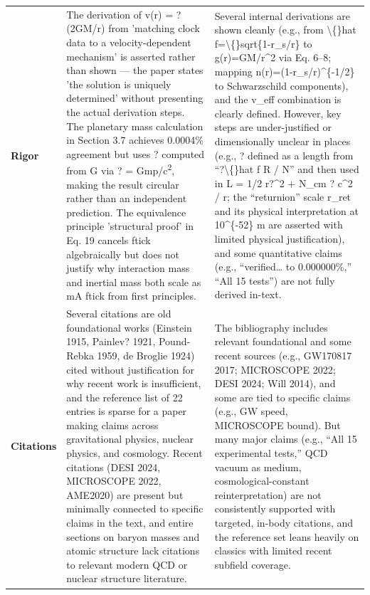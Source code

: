 \documentclass[11pt]{article}
\begin{document}
\begin{longtable}{@{} p{2.2cm} p{6.3cm} p{6.3cm} @{}}
\rowcolor{rowgray}
\textbf{Rigor} &
The derivation of v(r) = ?(2GM/r) from 'matching clock data to a velocity-dependent mechanism' is asserted rather than shown --- the paper states 'the solution is uniquely determined' without presenting the actual derivation steps. The planetary mass calculation in Section 3.7 achieves 0.0004\% agreement but uses ? computed from G via ? = Gmp/c\textsuperscript{2}, making the result circular rather than an independent prediction. The equivalence principle 'structural proof' in Eq. 19 cancels ftick algebraically but does not justify why interaction mass and inertial mass both scale as mA \texttimes{} ftick from first principles. &
Several internal derivations are shown cleanly (e.g., from \textbackslash\{\}hat f=\textbackslash\{\}sqrt\{1-r\_s/r\} to g(r)=GM/r\textasciicircum{}2 via Eq. 6--8; mapping n(r)=(1-r\_s/r)\textasciicircum{}\{-1/2\} to Schwarzschild components), and the v\_eff combination is clearly defined. However, key steps are under-justified or dimensionally unclear in places (e.g., ? defined as a length from ``?\textbackslash\{\}hat f \texttimes{} R / N'' and then used in L = 1/2 r?\textasciicircum{}2 + N\_cm ? c\textasciicircum{}2 / r; the ``returnion'' scale r\_ret and its physical interpretation at 10\textasciicircum{}\{-52\} m are asserted with limited physical justification), and some quantitative claims (e.g., ``verified\ldots{} to 0.000000\%,'' ``All 15 tests'') are not fully derived in-text. \\[6pt]

\textbf{Citations} &
Several citations are old foundational works (Einstein 1915, Painlev? 1921, Pound-Rebka 1959, de Broglie 1924) cited without justification for why recent work is insufficient, and the reference list of 22 entries is sparse for a paper making claims across gravitational physics, nuclear physics, and cosmology. Recent citations (DESI 2024, MICROSCOPE 2022, AME2020) are present but minimally connected to specific claims in the text, and entire sections on baryon masses and atomic structure lack citations to relevant modern QCD or nuclear structure literature. &
The bibliography includes relevant foundational and some recent sources (e.g., GW170817 2017; MICROSCOPE 2022; DESI 2024; Will 2014), and some are tied to specific claims (e.g., GW speed, MICROSCOPE bound). But many major claims (e.g., ``All 15 experimental tests,'' QCD vacuum as medium, cosmological-constant reinterpretation) are not consistently supported with targeted, in-body citations, and the reference set leans heavily on classics with limited recent subfield coverage. \\

\end{longtable}
\end{document}
